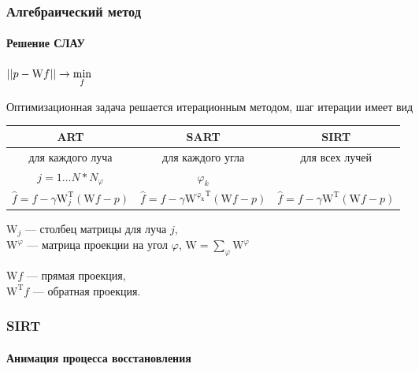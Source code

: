 \begin{frame}
\frametitle{Алгебраический метод}
\framesubtitle{Решение СЛАУ}
\centering
$\left|\left| p - \mathrm W f \right|\right| \rightarrow \min\limits_f$

Оптимизационная задача решается итерационным методом, шаг итерации имеет вид
\vspace{0.5cm}

\begingroup
\footnotesize

\hspace*{-0.5cm}
\begin{tabular}{c|c|c}
ART & SART & SIRT \\ \hline
для каждого луча & для каждого угла & для всех лучей\\
$j = 1 \dots N * N_\varphi$ & $\varphi_k$ & \\
$\hat{f} = f - \gamma \mathrm W^{\mathrm T}_j(\mathrm W f - p)$ &
$\hat{f} = f - \gamma \mathrm {W^{\varphi_k}}^{\mathrm T}(\mathrm W f - p)$ &
$\hat{f} = f - \gamma \mathrm W^{\mathrm T}(\mathrm W f - p)$ \\
\end{tabular}

\vspace{0.2cm}
\raggedright
\endgroup

$\mathrm W_j$ --- столбец матрицы для луча $j$,\\
$\mathrm W^\varphi$ ---  матрица проекции на угол $\varphi$, $\mathrm W = \sum_\varphi {\mathrm W^\varphi}$
\\
\vspace{0.4cm}

$\mathrm W f$ --- прямая проекция, \\
$\mathrm W^{\mathrm T} f$ --- обратная проекция.
\end{frame}


\begin{frame}
\frametitle{SIRT}
\framesubtitle{Анимация процесса восстановления}
\begin{columns}[T,onlytextwidth]
\begin{column}{0.4\textwidth}
\end{column}

\begin{column}{0.6\textwidth}
\end{column}
\end{columns}
\end{frame}

